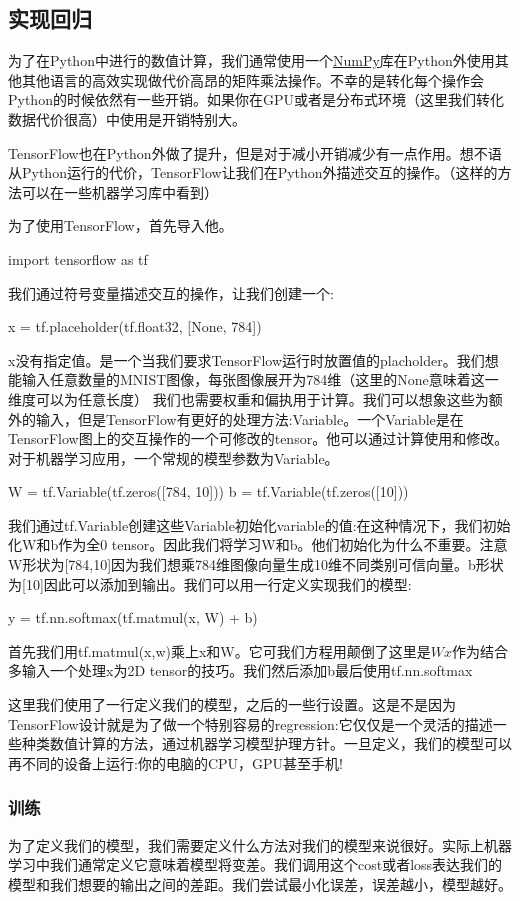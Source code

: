 \subsection{实现回归}
为了在Python中进行的数值计算，我们通常使用一个\href{http://www.numpy.org/}{NumPy}库在Python外使用其他其他语言的高效实现做代价高昂的矩阵乘法操作。不幸的是转化每个操作会Python的时候依然有一些开销。如果你在GPU或者是分布式环境（这里我们转化数据代价很高）中使用是开销特别大。

TensorFlow也在Python外做了提升，但是对于减小开销减少有一点作用。想不语从Python运行的代价，TensorFlow让我们在Python外描述交互的操作。（这样的方法可以在一些机器学习库中看到）

为了使用TensorFlow，首先导入他。
\begin{ipythoncode}
import tensorflow as tf 
\end{ipythoncode}
我们通过符号变量描述交互的操作，让我们创建一个:
\begin{ipythoncode}
x = tf.placeholder(tf.float32, [None, 784])
\end{ipythoncode}
x没有指定值。是一个当我们要求TensorFlow运行时放置值的placholder。我们想能输入任意数量的MNIST图像，每张图像展开为784维（这里的None意味着这一维度可以为任意长度）
我们也需要权重和偏执用于计算。我们可以想象这些为额外的输入，但是TensorFlow有更好的处理方法:Variable。一个Variable是在TensorFlow图上的交互操作的一个可修改的tensor。他可以通过计算使用和修改。对于机器学习应用，一个常规的模型参数为Variable。
\begin{pythoncode}
W = tf.Variable(tf.zeros([784, 10]))
b = tf.Variable(tf.zeros([10]))
\end{pythoncode}
我们通过tf.Variable创建这些Variable初始化variable的值:在这种情况下，我们初始化W和b作为全0 tensor。因此我们将学习W和b。他们初始化为什么不重要。注意W形状为[784,10]因为我们想乘784维图像向量生成10维不同类别可信向量。b形状为[10]因此可以添加到输出。我们可以用一行定义实现我们的模型:
\begin{pythoncode}
y = tf.nn.softmax(tf.matmul(x, W) + b)
\end{pythoncode}
首先我们用tf.matmul(x,w)乘上x和W。它可我们方程用颠倒了这里是$Wx$作为结合多输入一个处理x为2D tensor的技巧。我们然后添加b最后使用tf.nn.softmax

这里我们使用了一行定义我们的模型，之后的一些行设置。这是不是因为TensorFlow设计就是为了做一个特别容易的regression:它仅仅是一个灵活的描述一些种类数值计算的方法，通过机器学习模型护理方针。一旦定义，我们的模型可以再不同的设备上运行:你的电脑的CPU，GPU甚至手机!

\subsubsection{训练}
为了定义我们的模型，我们需要定义什么方法对我们的模型来说很好。实际上机器学习中我们通常定义它意味着模型将变差。我们调用这个cost或者loss表达我们的模型和我们想要的输出之间的差距。我们尝试最小化误差，误差越小，模型越好。

